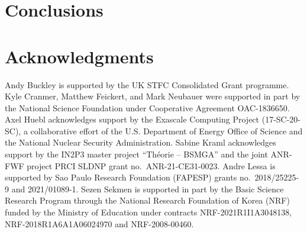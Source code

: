 \documentclass[11pt]{article}
\begin{document}
\section{Conclusions}

\section*{Acknowledgments}

Andy Buckley is supported by the UK STFC Consolidated Grant programme.
Kyle Cranmer, Matthew Feickert, and Mark Neubauer were supported in part by the National Science Foundation under Cooperative Agreement OAC-1836650.
Axel Huebl acknowledges support by the Exascale Computing Project (17-SC-20-SC), a collaborative effort of the U.S. Department of Energy Office of Science and the National Nuclear Security Administration.
Sabine Kraml acknowledges support by the IN2P3 master project ``Th\'eorie -- BSMGA'' and the joint ANR-FWF project PRCI SLDNP grant no.~ANR-21-CE31-0023.
Andre Lessa is supported by Sao Paulo Research Foundation (FAPESP) grants no.~2018/25225-9 and 2021/01089-1.
Sezen Sekmen is supported in part by the Basic Science Research Program through the National Research Foundation of Korea (NRF) funded by the Ministry of Education under contracts NRF-2021R1I1A3048138, NRF-2018R1A6A1A06024970 and NRF-2008-00460.


\def\thefootnote{\fnsymbol{footnote}}
\setcounter{footnote}{0}




\end{document}
